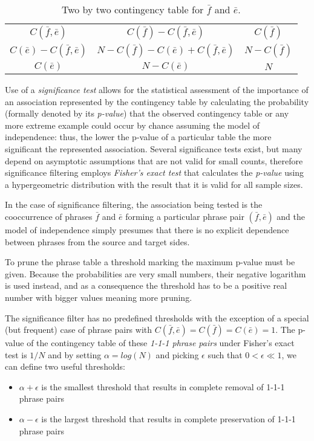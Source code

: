 \begin{table}[ht]
\centering
\def\arraystretch{1.5}
\begin{tabular}{ | c c | c | }
\hline
$C(\bar{f},\bar{e})$  &  $C(\bar{f}) - C(\bar{f},\bar{e})$  &  $C(\bar{f})$ \\
$C(\bar{e}) - C(\bar{f},\bar{e})$  &  $N - C(\bar{f}) - C(\bar{e}) + C(\bar{f},\bar{e})$  & $N - C(\bar{f})$ \\
\hline
$C(\bar{e})$  &  $N - C(\bar{e})$  &  $N$ \\
\hline
\end{tabular}
\caption{\label{two-by-two-contingency-table}
Two by two contingency table for $\bar{f}$ and $\bar{e}$.}
\end{table}

Use of a \emph{significance test} allows for the statistical assessment of the importance of an association
represented by the contingency table by calculating the probability (formally denoted
by its \emph{p-value}) that the observed contingency table or any more extreme example could
occur by chance assuming the model of independence: thus, the lower the p-value of
a particular table the more significant the represented association.
Several significance tests exist, but many depend on asymptotic assumptions
that are not valid for small counts, therefore significance filtering employs
\emph{Fisher's exact test} that calculates the \emph{p-value} using a hypergeometric
distribution with the result that it is valid for all sample sizes.

In the case of significance filtering, the association being tested is
the cooccurrence of phrases $\bar{f}$ and $\bar{e}$ forming a particular phrase pair $(\bar{f},\bar{e})$
and the model of independence simply presumes that there is no explicit dependence
between phrases from the source and target sides.

To prune the phrase table a threshold marking the maximum p-value must be given.
Because the probabilities are very small numbers, their negative logarithm is used
instead, and as a consequence the threshold has to be a positive real number with
bigger values meaning more pruning.

The significance filter has no predefined thresholds with the exception of a special
(but frequent) case of phrase pairs with $C(\bar{f},\bar{e}) = C(\bar{f}) = C(\bar{e}) = 1$.
The p-value of the contingency table of these \emph{1-1-1 phrase pairs} under Fisher's
exact test is $1/N$ and by setting $\alpha = log(N)$ and picking $\epsilon$ such that
$0 < \epsilon \ll 1$, we can define two useful thresholds:
\begin{itemize}
  \item $\alpha + \epsilon$ is the smallest threshold that results in complete removal
    of 1-1-1 phrase pairs
  \item $\alpha - \epsilon$ is the largest threshold that results in complete preservation
    of 1-1-1 phrase pairs
\end{itemize}

